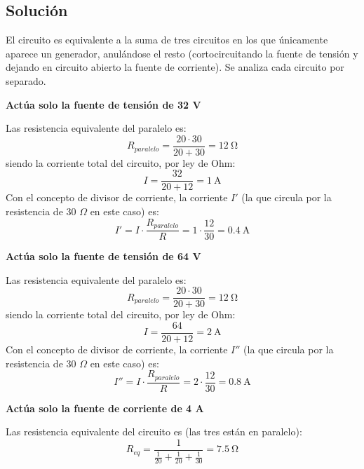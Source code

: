 \subsection*{Solución}
El circuito es equivalente a la suma de tres circuitos en los que
únicamente aparece un generador, anulándose el resto (cortocircuitando
la fuente de tensión y dejando en circuito abierto la fuente de
corriente). Se analiza cada circuito por separado.

\textbf{Actúa solo la fuente de tensión de 32 V}

Las resistencia equivalente del paralelo es:
\begin{equation*}
  R_{paralelo}=\dfrac{20\cdot 30}{20+30}=\qty{12}{\ohm}
\end{equation*}
siendo la corriente total del circuito, por ley de Ohm:
\begin{equation*}
  I=\dfrac{32}{20+12}=\qty{1}{\ampere}
\end{equation*}
Con el concepto de divisor de corriente, la corriente $I'$ (la que
circula por la resistencia de 30 $\Omega$ en este caso) es:
\begin{equation*}
  I'=I\cdot \dfrac{R_{paralelo}}{R}=1\cdot\dfrac{12}{30}=\qty{0.4}{\ampere}
\end{equation*}

\textbf{Actúa solo la fuente de tensión de 64 V}

Las resistencia equivalente del paralelo es:
\begin{equation*}
  R_{paralelo}=\dfrac{20\cdot 30}{20+30}=\qty{12}{\ohm}
\end{equation*}
siendo la corriente total del circuito, por ley de Ohm:
\begin{equation*}
  I=\dfrac{64}{20+12}=\qty{2}{\ampere}
\end{equation*}
Con el concepto de divisor de corriente, la corriente $I''$ (la que
circula por la resistencia de 30 $\Omega$ en este caso) es:
\begin{equation*}
  I''=I\cdot \dfrac{R_{paralelo}}{R
  }=2\cdot\dfrac{12}{30}=\qty{0.8}{\ampere}
\end{equation*}

\textbf{Actúa solo la fuente de corriente de 4 A}

Las resistencia equivalente del circuito es (las tres están en
paralelo):
\begin{equation*}
  R_{eq}=\dfrac{1}{\frac{1}{20}+\frac{1}{20}+\frac{1}{30}}=\qty{7.5}{\ohm}
\end{equation*}

